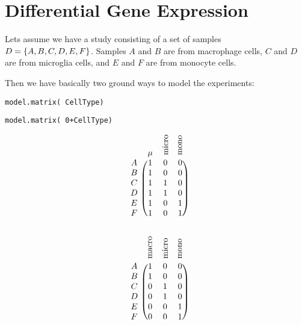 \section{Differential Gene Expression}

Lets assume we have a study consisting of a set of samples $D = \lbrace A, B, C, D, E, F\rbrace$. Samples $A$ and $B$ are from macrophage cells, $C$ and $D$ are from microglia cells, and $E$ and $F$ are from monocyte cells. 

Then we have basically two ground ways to model the experiments:

\begin{lrbox}{\saveBoxOne}
	\texttt{model.matrix(~CellType)} 
\end{lrbox}

\begin{lrbox}{\saveBoxTwo}
	\texttt{model.matrix(~0+CellType)}
\end{lrbox}

\begin{lrbox}{\saveBoxThree}
\begin{minipage}{5cm}
	\[
		\begin{blockarray}{cccc}
			& \mu & \text{\rotatebox{90}{micro}} & \text{\rotatebox{90}{mono}} &  \\
			\begin{block}{c(ccc)}
				A & 1 & 0 & 0  \\
				B & 1 & 0 & 0  \\
				C & 1 & 1 & 0  \\
				D & 1 & 1 & 0  \\
				E & 1 & 0 & 1  \\
				F & 1 & 0 & 1  \\
			\end{block}
		\end{blockarray}
	\]
\end{minipage}
\end{lrbox}

\begin{lrbox}{\saveBoxFour}
\begin{minipage}{5cm}
	\[
		\begin{blockarray}{cccc}
			& \text{\rotatebox{90}{macro}} & \text{\rotatebox{90}{micro}} & \text{\rotatebox{90}{mono}} &  \\
			\begin{block}{c(ccc)}
				A & 1 & 0 & 0  \\
				B & 1 & 0 & 0  \\
				C & 0 & 1 & 0  \\
				D & 0 & 1 & 0  \\
				E & 0 & 0 & 1  \\
				F & 0 & 0 & 1  \\
			\end{block}
		\end{blockarray}
	\]
\end{minipage}
\end{lrbox}

